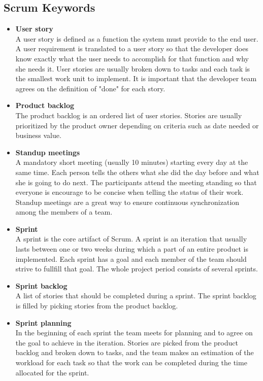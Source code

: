 \subsection{Scrum Keywords}
\begin{itemize}
\item{\textbf{User story}}\\
A user story is defined as a function the system must provide to the end user.
A user requirement is translated to a user story so that the developer does know exactly
what the user needs to accomplish for that function and why she needs it. User stories are usually
broken down to tasks and each task is the smallest work unit to implement.
It is important that the developer team agrees on the definition of "done" for each story.

\item{\textbf{Product backlog}}\\
The product backlog is an ordered list of user stories. Stories are usually prioritized by the product owner 
depending on criteria such as date needed or business value.

\item{\textbf{Standup meetings}}\\
A mandatory short meeting (usually 10 minutes) starting every day at the same time.
Each person tells the others what she did the day before and what she is going to do
next. The participants attend the meeting standing so that everyone is encourage to be concise
when telling the status of their work. Standup meetings are a great way to ensure continuous
synchronization among the members of a team.

\item{\textbf{Sprint}}\\
A sprint is the core artifact of Scrum. A sprint is an iteration that usually lasts between one or two weeks
during which a part of an entire product is implemented. Each sprint has a goal and each member of
the team should strive to fullfill that goal. The whole project period consists of several sprints.

\item{\textbf{Sprint backlog}}\\
A list of stories that should be completed during a sprint. The sprint backlog is filled by picking stories
from the product backlog.

\item{\textbf{Sprint planning}}\\
In the beginning of each sprint the team meets for planning and to agree on the goal to achieve in the iteration.
Stories are picked from the product backlog and broken down to tasks, and the team makes an estimation of the workload
for each task so that the work can be completed during the time allocated for the sprint.


\end{itemize}
